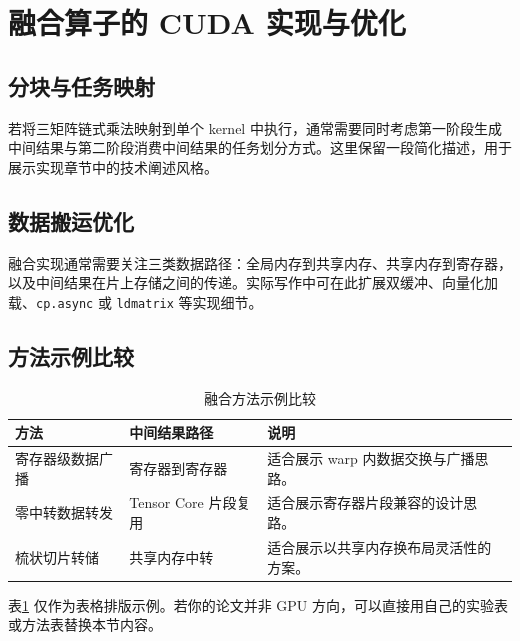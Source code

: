 \section{融合算子的 CUDA 实现与优化}

\subsection{分块与任务映射}

若将三矩阵链式乘法映射到单个 kernel 中执行，通常需要同时考虑第一阶段生成中间结果与第二阶段消费中间结果的任务划分方式。这里保留一段简化描述，用于展示实现章节中的技术阐述风格。

\subsection{数据搬运优化}

融合实现通常需要关注三类数据路径：全局内存到共享内存、共享内存到寄存器，以及中间结果在片上存储之间的传递。实际写作中可在此扩展双缓冲、向量化加载、\texttt{cp.async} 或 \texttt{ldmatrix} 等实现细节。

\subsection{方法示例比较}

\begin{table}[htbp]
    \centering
    \caption{融合方法示例比较}
    \label{tab:fusion_method_compare}
    \renewcommand{\arraystretch}{1.25}
    \begin{tabular}{p{3.2cm}p{3.0cm}p{5.6cm}}
        \toprule
        方法 & 中间结果路径 & 说明 \\
        \midrule
        寄存器级数据广播 & 寄存器到寄存器 & 适合展示 warp 内数据交换与广播思路。 \\
        零中转数据转发 & Tensor Core 片段复用 & 适合展示寄存器片段兼容的设计思路。 \\
        梳状切片转储 & 共享内存中转 & 适合展示以共享内存换布局灵活性的方案。 \\
        \bottomrule
    \end{tabular}
\end{table}

表\ref{tab:fusion_method_compare} 仅作为表格排版示例。若你的论文并非 GPU 方向，可以直接用自己的实验表或方法表替换本节内容。
